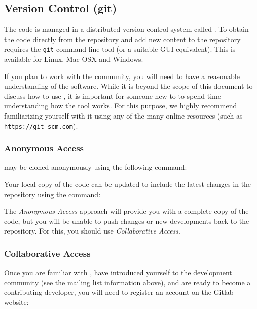 
\subsection{Version Control (git)}
\lstset{style=BashInputStyle}

The {\nek} code is managed in a distributed version control system called {\GIT}. To obtain the code directly from the repository and add new content to the repository requires the \texttt{git} command-line tool (or a suitable GUI equivalent). This is available for Linux, Mac OSX and Windows.

If you plan to work with the {\nek} community, you will
need to have a reasonable understanding of the {\GIT}
software.  While it is beyond the scope of this document to discuss
how to use {\GIT}, it is important for someone new to {\GIT} to spend
time understanding how the tool works.  For this purpose, we highly
recommend familiarizing yourself with it using any of the many online
resources (such as \texttt{https://git-scm.com}).

\subsubsection{Anonymous Access}

{\nek} may be cloned anonymously using the following command:


Your local copy of the code can be updated to include the latest changes in the repository using the command:


The \emph{Anonymous Access} approach will provide you with a complete copy of the code, but you will be unable to push changes or new developments back to the repository. For this, you should use \emph{Collaborative Access}.


\subsubsection{Collaborative Access}

Once you are familiar with {\GIT}, have introduced yourself to the
development community (see the mailing list information above), and
are ready to become a contributing developer, you will need to register
an account on the {\nek} Gitlab website:

